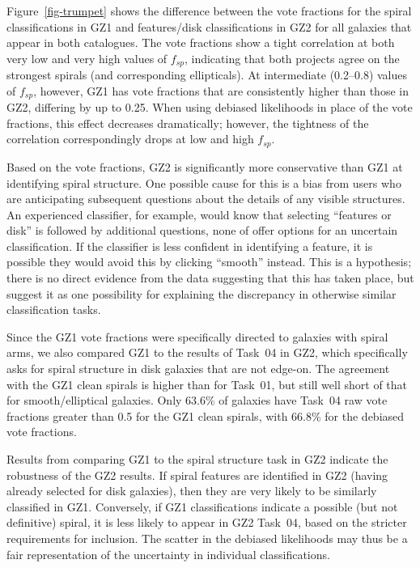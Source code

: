 \documentclass[useAMS,usenatbib]{mn2e}
\begin{document}
Figure~\ref{fig-trumpet} shows the difference between the vote fractions for the spiral classifications in GZ1 and features/disk classifications in GZ2 for all galaxies that appear in both catalogues. The vote fractions show a tight correlation at both very low and very high values of $f_{sp}$, indicating that both projects agree on the strongest spirals (and corresponding ellipticals). At intermediate (0.2--0.8) values of $f_{sp}$, however, GZ1 has vote fractions that are consistently higher than those in GZ2, differing by up to 0.25. When using debiased likelihoods in place of the vote fractions, this effect decreases dramatically; however, the tightness of the correlation correspondingly drops at low and high $f_{sp}$. 

Based on the vote fractions, GZ2 is significantly more conservative than GZ1 at identifying spiral structure. One possible cause for this is a bias from users who are anticipating subsequent questions about the details of any visible structures. An experienced classifier, for example, would know that selecting ``features or disk'' is followed by additional questions, none of offer options for an uncertain classification. If the classifier is less confident in identifying a feature, it is possible they would avoid this by clicking ``smooth'' instead. This is a hypothesis; there is no direct evidence from the data suggesting that this has taken place, but suggest it as one possibility for explaining the discrepancy in otherwise similar classification tasks. 

Since the GZ1 vote fractions were specifically directed to galaxies with spiral arms, we also compared GZ1 to the results of Task~04 in GZ2, which specifically asks for spiral structure in disk galaxies that are not edge-on. The agreement with the GZ1 clean spirals is higher than for Task~01, but still well short of that for smooth/elliptical galaxies. Only 63.6\% of galaxies have Task~04 raw vote fractions greater than 0.5 for the GZ1 clean spirals, with 66.8\% for the debiased vote fractions. 

Results from comparing GZ1 to the spiral structure task in GZ2 indicate the robustness of the GZ2 results. If spiral features are identified in GZ2 (having already selected for disk galaxies), then they are very likely to be similarly classified in GZ1. Conversely, if GZ1 classifications indicate a possible (but not definitive) spiral, it is less likely to appear in GZ2 Task~04, based on the stricter requirements for inclusion. The scatter in the debiased likelihoods may thus be a fair representation of the uncertainty in individual classifications.
\end{document}

